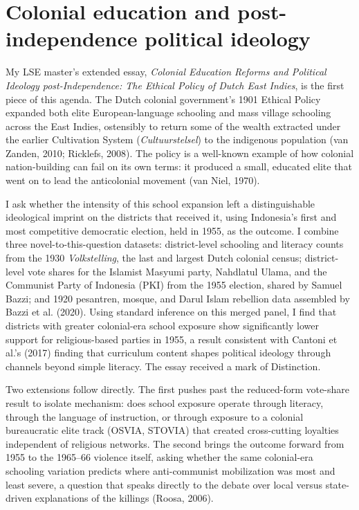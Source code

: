 \documentclass[letterpaper,11pt,leqno]{article}
\begin{document}
\section{Colonial education and post-independence political ideology}\label{s:education}

My LSE master's extended essay, \textit{Colonial Education Reforms and Political Ideology post-Independence: The Ethical Policy of Dutch East Indies}, is the first piece of this agenda. The Dutch colonial government's 1901 Ethical Policy expanded both elite European-language schooling and mass village schooling across the East Indies, ostensibly to return some of the wealth extracted under the earlier Cultivation System (\textit{Cultuurstelsel}) to the indigenous population (van Zanden, 2010; Ricklefs, 2008). The policy is a well-known example of how colonial nation-building can fail on its own terms: it produced a small, educated elite that went on to lead the anticolonial movement (van Niel, 1970).

I ask whether the intensity of this school expansion left a distinguishable ideological imprint on the districts that received it, using Indonesia's first and most competitive democratic election, held in 1955, as the outcome. I combine three novel-to-this-question datasets: district-level schooling and literacy counts from the 1930 \textit{Volkstelling}, the last and largest Dutch colonial census; district-level vote shares for the Islamist Masyumi party, Nahdlatul Ulama, and the Communist Party of Indonesia (PKI) from the 1955 election, shared by Samuel Bazzi; and 1920 pesantren, mosque, and Darul Islam rebellion data assembled by Bazzi et al. (2020). Using standard inference on this merged panel, I find that districts with greater colonial-era school exposure show significantly lower support for religious-based parties in 1955, a result consistent with Cantoni et al.'s (2017) finding that curriculum content shapes political ideology through channels beyond simple literacy. The essay received a mark of Distinction.

Two extensions follow directly. The first pushes past the reduced-form vote-share result to isolate mechanism: does school exposure operate through literacy, through the language of instruction, or through exposure to a colonial bureaucratic elite track (OSVIA, STOVIA) that created cross-cutting loyalties independent of religious networks. The second brings the outcome forward from 1955 to the 1965--66 violence itself, asking whether the same colonial-era schooling variation predicts where anti-communist mobilization was most and least severe, a question that speaks directly to the debate over local versus state-driven explanations of the killings (Roosa, 2006).
\end{document}
